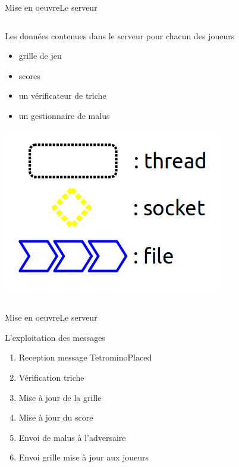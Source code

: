 \documentclass[french]{beamer}
\begin{document}
\begin{frame}{Mise en oeuvre}{Le serveur}
\begin{columns}
			\begin{column}{0.5\textwidth}

				\begin{block}{Les données contenues dans le serveur pour chacun des joueurs}
					\begin{itemize}
						\item grille de jeu
						\item scores
						\item un vérificateur de triche
						\item un gestionnaire de malus
					\end{itemize}
				\end{block}

				\begin{center}
					\includegraphics[scale=0.25]{img/legende.png}
				\end{center}

			\end{column}

		\end{columns}
	\end{frame}




	\begin{frame}[fragile]{Mise en oeuvre}{Le serveur}
		\begin{block}{L'exploitation des messages}
			\begin{enumerate}
				\item{Reception message TetrominoPlaced}
				\item{Vérification triche}
				\item{Mise à jour de la grille}
				\item{Mise à jour du score}
				\item{Envoi de malus à l'adversaire}
				\item{Envoi grille mise à jour aux joueurs}
			\end{enumerate}
		\end{block}

	\end{frame}
\end{document}

